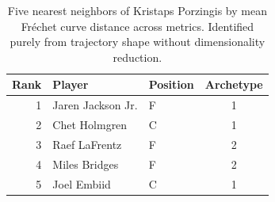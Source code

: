 \begin{table}[htbp]
  \centering\small
  \begin{tabular}{rllc}
    \toprule
    Rank & Player & Position & Archetype \\
    \midrule
    1 & Jaren Jackson Jr. & F & 1 \\
    2 & Chet Holmgren & C & 1 \\
    3 & Raef LaFrentz & F & 2 \\
    4 & Miles Bridges & F & 2 \\
    5 & Joel Embiid & C & 1 \\
    \bottomrule
  \end{tabular}
  \caption{Five nearest neighbors of Kristaps Porzingis by mean Fr\'{e}chet curve distance across metrics. Identified purely from trajectory shape without dimensionality reduction.}
  \label{tab:Kristaps_Porzingis_frechet_curve_neighbors}
\end{table}

